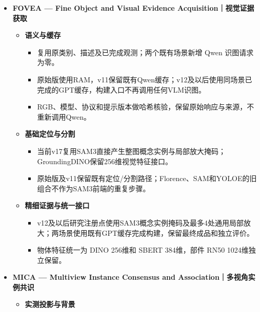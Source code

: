 \documentclass[UTF8,fontset=fandol]{ctexart}
\begin{document}
\begin{itemize}
\item \textbf{FOVEA — Fine Object and Visual Evidence Acquisition｜视觉证据获取}


\begin{itemize}
\item \textbf{语义与缓存}


\begin{itemize}
\item 复用原类别、描述及已完成观测；两个既有场景新增 Qwen 识图请求为零。


\item 原始版使用RAM，v11保留既有Qwen缓存；v12及以后使用同场景已完成的GPT缓存，构建入口不再调用任何VLM识图。


\item RGB、模型、协议和提示版本做哈希核验，保留原始响应与来源，不重新调用Qwen。

\end{itemize}

\item \textbf{基础定位与分割}


\begin{itemize}
\item 当前v17复用SAM3直接产生整图概念实例与局部放大掩码；GroundingDINO保留256维视觉特征接口。


\item 原始版及v11保留既有定位/分割路径；Florence、SAM和YOLOE的旧组合不作为SAM3前端的重复步骤。

\end{itemize}

\item \textbf{精细证据与统一接口}


\begin{itemize}
\item v12及以后研究注册点使用SAM3概念实例掩码及最多4处通用局部放大；两场景使用既有GPT缓存完成构建，保留最终成品和独立评价。


\item 物体特征统一为 DINO 256维和 SBERT 384维，部件 RN50 1024维独立保留。

\end{itemize}
\end{itemize}

\item \textbf{MICA — Multiview Instance Consensus and Association｜多视角实例共识}


\begin{itemize}
\item \textbf{实测投影与背景}



\end{itemize}
\end{itemize}
\end{document}
